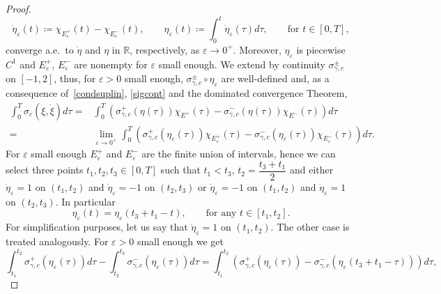 \documentclass[11pt,a4paper,american]{article}
\newcommand{\Rds}{\mathds R}
\begin{document}
\begin{proof}
        \begin{equation*}
            \dot\eta_\varepsilon(t)\coloneqq\chi_{E^+_\varepsilon}(t)-\chi_{E^-_\varepsilon}(t),\qquad\eta_\varepsilon(t)\coloneqq\int_0^t\dot\eta_\varepsilon(\tau)d\tau,\qquad\text{for }t\in[0,T],
        \end{equation*}
        converge a.e.\ to $\dot\eta$ and $\eta$ in $\Rds$, respectively, as $\varepsilon\to0^+$. Moreover, $\eta_\varepsilon$ is piecewise $C^1$ and $E^+_\varepsilon$, $E^-_\varepsilon$ are nonempty for $\varepsilon$ small enough. We extend by continuity $\sigma_{\gamma,c}^\pm$ on $[-1,2]$, thus, for $\varepsilon>0$ small enough, $\sigma_{\gamma,c}^\pm\circ\eta_\varepsilon$ are well-defined and, as a consequence of~\ref{condsuplin}, \cref{sigcont} and the dominated convergence Theorem,
        \begin{equation}\label{eq:sigestauxbis3}
            \begin{aligned}
                \int_0^T\sigma_c\left(\xi,\dot\xi\right)d\tau=&\int_0^T\left(\sigma_{\gamma,c}^+(\eta(\tau))\chi_{E^+}(\tau)-\sigma_{\gamma,c}^-(\eta(\tau))\chi_{E^-}(\tau)\right)d\tau\\
                =&\lim_{\varepsilon\to0^+}\int_0^T\left(\sigma_{\gamma,c}^+(\eta_\varepsilon(\tau))\chi_{E^+_\varepsilon}(\tau)-\sigma_{\gamma,c}^-(\eta_\varepsilon(\tau))\chi_{E^-_\varepsilon}(\tau)\right)d\tau.
            \end{aligned}
        \end{equation}
        For $\varepsilon$ small enough $E^+_\varepsilon$ and $E^-_\varepsilon$ are the finite union of intervals, hence we can select three points $t_1,t_2,t_3\in[0,T]$ such that $t_1<t_3$, $t_2=\dfrac{t_3+t_1}2$ and either $\dot\eta_\varepsilon=1$ on $(t_1,t_2)$ and $\dot\eta_\varepsilon=-1$ on $(t_2,t_3)$ or $\dot\eta_\varepsilon=-1$ on $(t_1,t_2)$ and $\dot\eta_\varepsilon=1$ on $(t_2,t_3)$. In particular
        \begin{equation*}
            \eta_\varepsilon(t)=\eta_\varepsilon(t_3+t_1-t),\qquad\text{for any }t\in[t_1,t_2].
        \end{equation*}
        For simplification purposes, let us say that $\dot\eta_\varepsilon=1$ on $(t_1,t_2)$. The other case is treated analogously. For $\varepsilon>0$ small enough we get
        \begin{equation*}
            \int_{t_1}^{t_2}\sigma_{\gamma,c}^+(\eta_\varepsilon(\tau))d\tau-\int_{t_2}^{t_3}\sigma_{\gamma,c}^-(\eta_\varepsilon(\tau))d\tau=\int_{t_1}^{t_2}\left(\sigma_{\gamma,c}^+(\eta_\varepsilon(\tau))-\sigma_{\gamma,c}^-(\eta_\varepsilon(t_3+t_1-\tau))\right)d\tau,

\end{equation*}
\end{proof}
\end{document}
